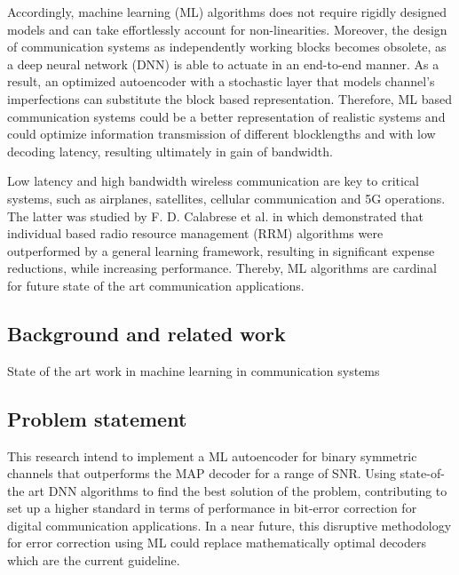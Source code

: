 \documentclass[conference]{IEEEtran}
\begin{document}
Accordingly, machine learning (ML) algorithms does not require rigidly designed models and can take effortlessly account for non-linearities. Moreover, the design of communication systems as independently working blocks becomes obsolete, as a deep neural network (DNN) is able to actuate in an end-to-end manner. As a result, an optimized autoencoder with a stochastic layer that models channel's imperfections can substitute the block based representation. Therefore, ML based communication systems could be a better representation of realistic systems and could optimize information transmission of different blocklengths and with low decoding latency, resulting ultimately in gain of bandwidth.  

Low latency and high bandwidth wireless communication are key to critical systems, such as airplanes, satellites, cellular communication and 5G operations. The latter was studied by F. D. Calabrese et al. in \cite{b3} which  demonstrated that individual based radio resource management (RRM) algorithms were outperformed by a general learning framework, resulting in significant expense reductions, while increasing performance. Thereby, ML algorithms are cardinal for future state of the art communication applications.
  
\subsection{Background and related work}

State of the art work in machine learning in communication systems
\subsection{Problem statement}

This research intend to implement a ML autoencoder for binary symmetric channels that outperforms the MAP decoder for a range of SNR. Using state-of-the art DNN algorithms to find the best solution of the problem, contributing to set up a higher standard in terms of performance in bit-error correction for digital communication applications. In a near future, this disruptive methodology for error correction using ML could replace mathematically optimal decoders which are the current guideline.


\end{document}

